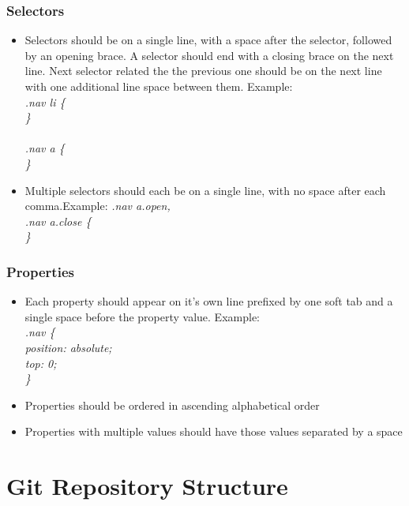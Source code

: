 \documentclass[12pt]{report}
\begin{document}
\subsubsection{Selectors}
\begin{itemize}[noitemsep]
\item Selectors should be on a single line, with a space after the selector, followed by an opening brace. A selector should end with a closing brace on the next line. Next selector related the the previous one should be on the next line with one additional line space between them. Example: \\
    \textit{
        .nav li \{\\
    \}\\
    \\
    .nav a \{\\
    \}\\
    }
\item Multiple selectors should each be on a single line, with no space after each comma.Example:
	\textit{
    	.nav a.open, \\
        .nav a.close \{ \\
        \}
    }
\end{itemize}

\subsubsection{Properties}
\begin{itemize}[noitemsep]
\item Each property should appear on it's own line prefixed by one soft tab and a single space before the property value. Example: \\
	\textit{
    	.nav \{\\
        \hspace*{4ex} position: absolute;\\
        \hspace*{4ex} top: 0;\\
      \}
    }
\item Properties should be ordered in ascending alphabetical order
\item Properties with multiple values should have those values separated by a space
\end{itemize}

\pagebreak
\section{Git Repository Structure}
\end{document}
